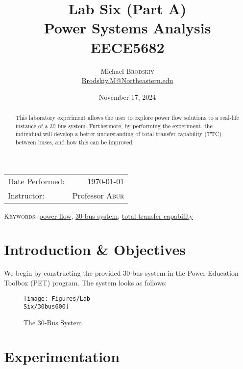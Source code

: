 \documentclass[
	letterpaper, %
	10pt, %
]{CSUniSchoolLabReport}
\title{Lab Six (Part A)\\ Power Systems Analysis \\ EECE5682} %
\author{Michael \textsc{Brodskiy}\\ \small \href{mailto:Brodskiy.M@Northeastern.edu}{Brodskiy.M@Northeastern.edu}}
\date{November 17, 2024} %
\begin{document}
\maketitle %

\begin{center}
	\begin{tabular}{l r}
		Date Performed: & \today \\ %
		Instructor: & Professor \textsc{Abur} \\ %
	\end{tabular}
\end{center}

\newpage

\begin{abstract}

  This laboratory experiment allows the user to explore power flow solutions to a real-life instance of a 30-bus system. Furthermore, by performing the experiment, the individual will develop a better understanding of total transfer capability (TTC) between buses, and how this can be improved.

\end{abstract}

\begin{flushleft}

  \textsc{Keywords:} \underline{power flow}, \underline{30-bus system}, \underline{total transfer capability}

\end{flushleft}

\newpage

\section{Introduction \& Objectives}

We begin by constructing the provided 30-bus system in the Power Education Toolbox (PET) program. The system looks as follows:

\begin{figure}[H]
  \centering
  \texttt{[image: Figures/Lab\\ Six/30bus600]}
  \caption{The 30-Bus System}
  \label{fig:1}
\end{figure}

\section{Experimentation}
\end{document}
